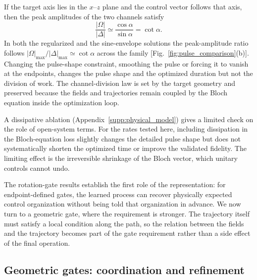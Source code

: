 \documentclass[aps,prx,reprint,superscriptaddress,nofootinbib,longbibliography,floatfix,showkeys]{revtex4-2}
\newcommand{\appsecref}[1]{Appendix~\hyperref[#1]{\ref*{#1}}}
\begin{document}
If the target axis lies in the $x$--$z$ plane and the control vector follows
that axis, then the peak amplitudes of the two channels satisfy
\begin{equation}
    \frac{|\Omega|}{|\Delta|}
    \simeq
    \frac{\cos\alpha}{\sin\alpha}
    =
    \cot\alpha .
    \label{eq:division_law}
\end{equation}
In both the regularized and the sine-envelope solutions the peak-amplitude
ratio follows $|\Omega|_{\max}/|\Delta|_{\max}\simeq\cot\alpha$ across the
family [Fig.~\ref{fig:pulse_comparison}(b)].  Changing the pulse-shape
constraint, smoothing the pulse or forcing it to vanish at the endpoints,
changes the pulse shape and the optimized duration but not the division of
work.  The channel-division law is set by the target geometry and preserved
because the fields and trajectories remain coupled by the Bloch equation
inside the optimization loop.

A dissipative ablation (\appsecref{supp:physical_model}) gives a limited
check on the role of open-system terms.  For the rates tested here,
including dissipation in the Bloch-equation loss slightly changes the
detailed pulse shape but does not systematically shorten the optimized time
or improve the validated fidelity.  The limiting effect is the irreversible
shrinkage of the Bloch vector, which unitary controls cannot undo.

The rotation-gate results establish the first role of the representation:
for endpoint-defined gates, the learned process can recover physically
expected control organization without being told that organization in
advance.  We now turn to a geometric gate, where the requirement is
stronger.  The trajectory itself must satisfy a local condition along the
path, so the relation between the fields and the trajectory becomes part of
the gate requirement rather than a side effect of the final operation.

\FloatBarrier

\subsection{Geometric gates: coordination and refinement}
\label{sec:geometric_gate}
\end{document}
